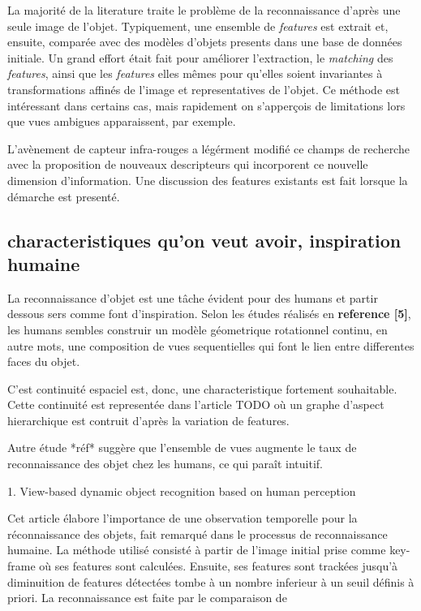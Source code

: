 La majorité de la literature traite le problème de la reconnaissance d'après une seule image de l'objet. Typiquement, une ensemble de \textit{features} est extrait et, ensuite, comparée avec des modèles d'objets presents dans une base de données initiale. Un grand effort était fait pour améliorer l'extraction, le \textit{matching} des \textit{features}, ainsi que les \textit{features} elles mêmes pour qu'elles soient invariantes à transformations affinés de l'image et representatives de l'objet. Ce méthode est intéressant dans certains cas, mais rapidement on s'apperçois de limitations lors que vues ambigues apparaissent, par exemple. 

L'avènement de capteur infra-rouges a légérment modifié ce champs de recherche avec la proposition de nouveaux descripteurs qui incorporent ce nouvelle dimension d'information. Une discussion des features existants est fait lorsque la démarche est presenté.


\subsection{characteristiques qu'on veut avoir, inspiration humaine}

La reconnaissance d'objet est une tâche évident pour des humans et partir dessous sers comme font d'inspiration.
Selon les études réalisés en \textbf{reference [5]}, les humans sembles construir un modèle géometrique rotationnel continu, en autre mots, une composition de vues sequentielles qui font le lien entre differentes faces du objet. 

C'est continuité espaciel est, donc, une characteristique fortement souhaitable. Cette continuité est representée dans l'article {\color{red} TODO} où un graphe d'aspect hierarchique est contruit d'après la variation de features. 

Autre étude *réf* suggère que l'ensemble de vues augmente le taux de reconnaissance des objet chez les humans, ce qui paraît intuitif.


1. View-based dynamic object recognition based on human perception 

Cet article élabore l'importance de une observation temporelle pour la réconnaissance des objets, fait remarqué dans le processus de reconnaissance humaine.
La méthode utilisé consisté à partir de l'image initial prise comme key-frame où ses features sont calculées. Ensuite, ses features sont trackées jusqu'à diminuition de features détectées tombe à un nombre inferieur à un seuil définis à priori. La reconnaissance est faite par le comparaison de 




